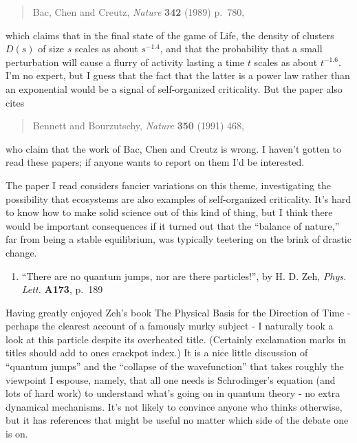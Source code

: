 \documentclass{article}
\def\tightlist{}
\begin{document}
\begin{quote}
Bac, Chen and Creutz, \emph{Nature} \textbf{342} (1989) p.~780,
\end{quote}

which claims that in the final state of the game of Life, the density of
clusters \(D(s)\) of size \(s\) scales as about \(s^{-1.4}\), and that
the probability that a small perturbation will cause a flurry of
activity lasting a time \(t\) scales as about \(t^{-1.6}\). I'm no
expert, but I guess that the fact that the latter is a power law rather
than an exponential would be a signal of self-organized criticality. But
the paper also cites

\begin{quote}
Bennett and Bourzutschy, \emph{Nature} \textbf{350} (1991) 468,
\end{quote}

who claim that the work of Bac, Chen and Creutz is wrong. I haven't
gotten to read these papers; if anyone wants to report on them I'd be
interested.

The paper I read considers fancier variations on this theme,
investigating the possibility that ecosystems are also examples of
self-organized criticality. It's hard to know how to make solid science
out of this kind of thing, but I think there would be important
consequences if it turned out that the ``balance of nature,'' far from
being a stable equilibrium, was typically teetering on the brink of
drastic change.

\begin{enumerate}
\def\labelenumi{\arabic{enumi})}
\setcounter{enumi}{1}
\tightlist
\item
  ``There are no quantum jumps, nor are there particles!'', by H. D.
  Zeh, \emph{Phys. Lett.} \textbf{A173}, p.~189
\end{enumerate}

Having greatly enjoyed Zeh's book The Physical Basis for the Direction
of Time - perhaps the clearest account of a famously murky subject - I
naturally took a look at this particle despite its overheated title.
(Certainly exclamation marks in titles should add to ones crackpot
index.) It is a nice little discussion of ``quantum jumps'' and the
``collapse of the wavefunction'' that takes roughly the viewpoint I
espouse, namely, that all one needs is Schrodinger's equation (and lots
of hard work) to understand what's going on in quantum theory - no extra
dynamical mechanisms. It's not likely to convince anyone who thinks
otherwise, but it has references that might be useful no matter which
side of the debate one is on.
\end{document}
